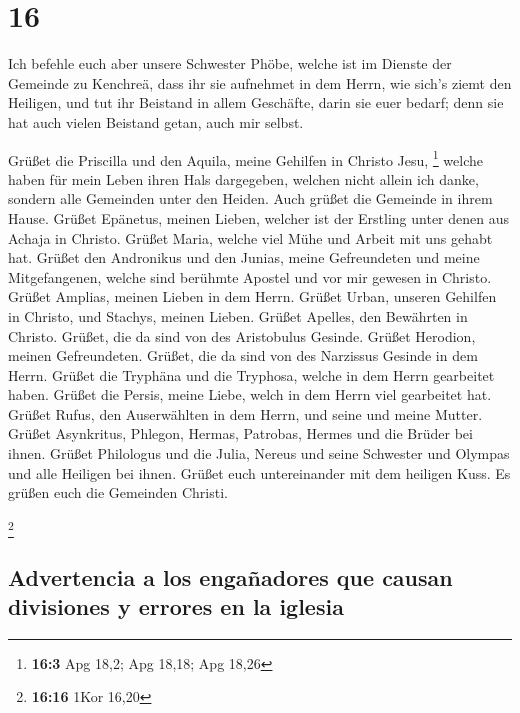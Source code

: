 \hypertarget{section-15}{%
\section{16}\label{section-15}}

 Ich befehle euch aber unsere Schwester Phöbe, welche ist
im Dienste der Gemeinde zu Kenchreä,  dass ihr sie
aufnehmet in dem Herrn, wie sich's ziemt den Heiligen, und tut ihr
Beistand in allem Geschäfte, darin sie euer bedarf; denn sie hat auch
vielen Beistand getan, auch mir selbst.

 Grüßet die Priscilla und den Aquila, meine Gehilfen in
Christo Jesu, \footnote{\textbf{16:3} Apg 18,2; Apg 18,18; Apg 18,26}
 welche haben für mein Leben ihren Hals dargegeben,
welchen nicht allein ich danke, sondern alle Gemeinden unter den Heiden.
 Auch grüßet die Gemeinde in ihrem Hause. Grüßet Epänetus,
meinen Lieben, welcher ist der Erstling unter denen aus Achaja in
Christo.  Grüßet Maria, welche viel Mühe und Arbeit mit
uns gehabt hat.  Grüßet den Andronikus und den Junias,
meine Gefreundeten und meine Mitgefangenen, welche sind berühmte Apostel
und vor mir gewesen in Christo.  Grüßet Amplias, meinen
Lieben in dem Herrn.  Grüßet Urban, unseren Gehilfen in
Christo, und Stachys, meinen Lieben.  Grüßet Apelles, den
Bewährten in Christo. Grüßet, die da sind von des Aristobulus Gesinde.
 Grüßet Herodion, meinen Gefreundeten. Grüßet, die da
sind von des Narzissus Gesinde in dem Herrn.  Grüßet die
Tryphäna und die Tryphosa, welche in dem Herrn gearbeitet haben. Grüßet
die Persis, meine Liebe, welch in dem Herrn viel gearbeitet hat.
 Grüßet Rufus, den Auserwählten in dem Herrn, und seine
und meine Mutter.  Grüßet Asynkritus, Phlegon, Hermas,
Patrobas, Hermes und die Brüder bei ihnen.  Grüßet
Philologus und die Julia, Nereus und seine Schwester und Olympas und
alle Heiligen bei ihnen.  Grüßet euch untereinander mit
dem heiligen Kuss. Es grüßen euch die Gemeinden Christi.

\footnote{\textbf{16:16} 1Kor 16,20}

\hypertarget{advertencia-a-los-engauxf1adores-que-causan-divisiones-y-errores-en-la-iglesia}{%
\subsection{Advertencia a los engañadores que causan divisiones y
errores en la
iglesia}\label{advertencia-a-los-engauxf1adores-que-causan-divisiones-y-errores-en-la-iglesia}}

